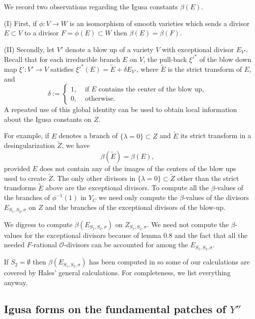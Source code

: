 \documentclass[12pt,letterpaper]{amsart}
\begin{document}
We record two observations regarding the Igusa constants $\beta(E)$.

\noindent
(I)
First, if $\phi:V\rightarrow W$ is an isomorphism of smooth varieties
which sends a divisor $E\subset V$ to a divisor $F=\phi(E)\subset W$
then $\beta(E)=\beta(F)$.

\noindent
(II)
Secondly, let $V'$ denote a blow up of a variety
$V$ with exceptional divisor $E_{V'}$.
Recall that for each irreducible branch $E$ on $V$,
the pull-back ${\xi'}^*$ of the blow down map $\xi':V'\rightarrow V$
satisfies ${\xi'}^*(E)=\tilde{E}+\delta E_{V'}$, where $\tilde{E}$
is the strict transform
of $E$, and
\[
\delta:=
\begin{cases} 1, &\text{ if $E$ contains the center of the blow up},\\
0, &\text{ otherwise}.
\end{cases}
\]
A repeated use of this global identity can be used to obtain
local information about the
Igusa constants on $Z$.

For example, if $E$ denotes a branch of $\{\lambda =0\}\subset Z$ and
$\tilde{E}$ its strict transform in a desingularization $\tilde{Z}$,
we have
\[
\beta(\tilde{E})=\beta(E),
\]
provided $E$ does not contain any of the images of the centers of
the blow ups used to create $\tilde{Z}$. The only other divisors
in $\{\lambda =0\}\subset \tilde{Z}$ other than the strict
transforms $\tilde{E}$ above are the exceptional divisors.
To compute all the $\beta$-values of the
branches of $\phi^{-1}(1)$ in $Y_C$ we need only compute the $\beta$-values
of the divisors $E_{S_1,S_2,\sigma}$ on $Z$ and the branches of
the exceptional divisors of the blow-up.

We digress to
compute $\beta({E}_{S_1,S_2,\sigma})$ on $Z_{S_1,S_2,\sigma}$. We
need not compute the $\beta$-values for the exceptional divisors
because of lemma 0.8 and the fact that all the needed $F$-rational
${\mathcal O}$-divisors can be accounted for among the $E_{S_1,S_2,\sigma}$.

If $S_2=\emptyset$ then $\beta({E}_{S_1,S_2,\sigma})$
has been computed in \cite[ch II, Proposition 9.1]{Ha92a}
so some of our calculations are covered by Hales' general
calculations. For completeness, we list everything anyway.

\subsection*{Igusa forms on the fundamental patches of $Y''$}
\end{document}
